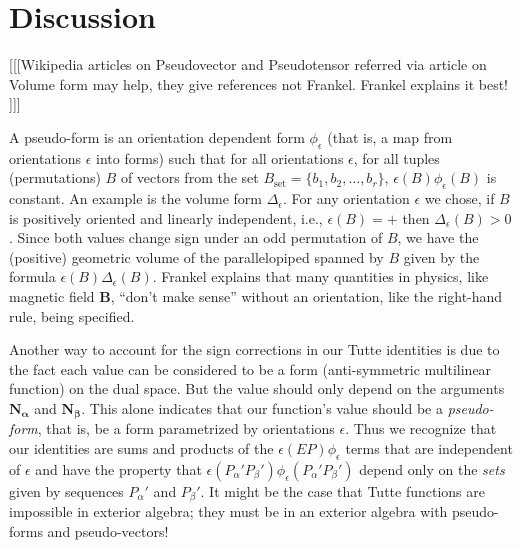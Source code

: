 \documentclass[Unicode]{cedram-alco}
\newcommand{\ext}[1]{\ensuremath{\mathbf{#1}}}
\begin{document}






\section{Discussion}\label{remarks}
[[[Wikipedia articles on Pseudovector and Pseudotensor
      referred via article on Volume form may help, they give references not  Frankel.
      Frankel explains it best! ]]]

A pseudo-form\cite[p 85-87]{Frankel} is an orientation dependent form $\phi_\epsilon$ (that is, a
map from orientations $\epsilon$ into forms) such that
for all orientations $\epsilon$, for all tuples (permutations) $B$ of vectors from the
set $B_{\text{set}}=\{b_1, b_2, \ldots, b_r\}$, $\epsilon(B)\phi_\epsilon(B)$
is constant. An example is the volume form $\Delta_\epsilon$.
For any orientation $\epsilon$ we chose,
if $B$ is positively oriented and linearly independent, i.e., $\epsilon(B)=+$
then $\Delta_\epsilon(B)>0$.  Since both values change sign under an odd permutation
of $B$, we have the (positive) geometric volume of the
parallelopiped spanned by $B$ given by the formula $\epsilon(B)\Delta_\epsilon(B)$.
Frankel explains that many quantities in physics, like magnetic field $\ext{B}$,
``don't make sense'' without
an orientation, like the right-hand rule,
being specified.


Another way to account for the sign corrections in our Tutte identities
is due to the fact each value can be considered to be a form (anti-symmetric
multilinear function) on the dual space. But the value should only depend
on the arguments $\ext{N_\alpha}$ and $\ext{N_\beta}$. This alone indicates
that our function's value should be a \emph{pseudo-form}, that is,
be a form parametrized by orientations $\epsilon$.  Thus we recognize that
our identities are sums and products of the $\epsilon(EP)\phi_\epsilon$ terms
that are independent of $\epsilon$ and have the property that
$\epsilon(P_\alpha'P_\beta')\phi_\epsilon(P_\alpha'P_\beta')$
depend only on the \emph{sets} given by sequences $P_\alpha'$ and $P_\beta'$.
It might be the case that Tutte functions are impossible in
exterior algebra; they must be in an exterior algebra with pseudo-forms
and pseudo-vectors!
\end{document}

